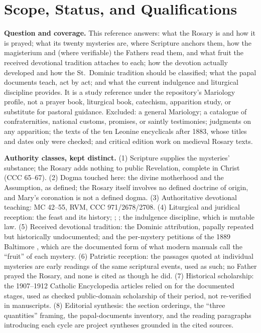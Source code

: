 \sectionguard
\section{Scope, Status, and Qualifications}
\label{sec:scope}

\textbf{Question and coverage.} This reference answers: what the Rosary
is and how it is prayed; what its twenty mysteries are, where Scripture
anchors them, how the magisterium and (where verifiable) the Fathers
read them, and what fruit the received devotional tradition attaches to
each; how the devotion actually developed and how the St.~Dominic
tradition should be classified; what the papal documents teach, act by
act; and what the current indulgence and liturgical discipline provides.
It is a study reference under the repository's Mariology profile, not a
prayer book, liturgical book, catechism, apparition study, or substitute
for pastoral guidance. Excluded: a general Mariology; a catalogue of
confraternities, national customs, promises, or saintly testimonies;
judgments on any apparition; the texts of the ten Leonine encyclicals
after 1883, whose titles and dates only were checked; and critical
edition work on medieval Rosary texts.

\textbf{Authority classes, kept distinct.} (1) Scripture supplies the
mysteries' substance; the Rosary adds nothing to public Revelation,
complete in Christ (CCC 65--67). (2) Dogma touched here: the divine
motherhood and the Assumption, as defined; the Rosary itself involves no
defined doctrine of origin, and Mary's coronation is not a defined
dogma. (3) Authoritative devotional teaching: MC 42--55, RVM, CCC
971/2678/2708. (4) Liturgical and juridical reception: the feast and its
history; ; ; the indulgence
discipline, which is mutable law. (5) Received devotional tradition: the
Dominic attribution, papally repeated but historically undocumented; and
the per-mystery petitions of the 1889 Baltimore , which are the documented form of what modern manuals call the
``fruit'' of each mystery. (6) Patristic reception: the passages quoted
at individual mysteries are early readings of the same scriptural
events, used as such; no Father prayed the Rosary, and none is cited as
though he did. (7) Historical scholarship: the 1907--1912 Catholic
Encyclopedia articles relied on for the documented stages, used as
checked public-domain scholarship of their period, not re-verified in
manuscripts. (8) Editorial synthesis: the section orderings, the ``three
quantities'' framing, the papal-documents inventory, and the reading
paragraphs introducing each cycle are project syntheses grounded in the
cited sources.

